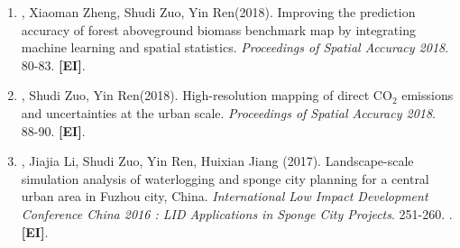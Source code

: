 \begin{enumerate}
    . \textbf{[C journal, CSSCI, CSCD, in Chinese, T1 Journal in geography]}.
\item
    \Shaoqing\CF, Xiaoman Zheng\CF, Shudi Zuo, Yin Ren\CS (2018).
    Improving the prediction accuracy of forest aboveground biomass benchmark map by integrating machine learning and spatial statistics.
    \textit{Proceedings of Spatial Accuracy 2018}. 80-83.
    \textbf{[EI]}.
\item
    \Shaoqing, Shudi Zuo, Yin Ren\CS (2018).
    High-resolution mapping of direct CO$_2$ emissions and uncertainties at the urban scale.
    \textit{Proceedings of Spatial Accuracy 2018}. 88-90.
    \textbf{[EI]}.
\item
    \Shaoqing, Jiajia Li, Shudi Zuo, Yin Ren, Huixian Jiang (2017).
	Landscape-scale simulation analysis of waterlogging and sponge city planning for a central urban area in Fuzhou city, China.
    \textit{International Low Impact Development Conference China 2016 : LID Applications in Sponge City Projects}. 251-260.
    . \textbf{[EI]}.
\end{enumerate}

